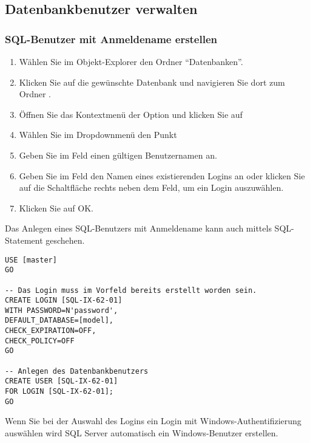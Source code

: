         \subsection{Datenbankbenutzer verwalten}
          \subsubsection{SQL-Benutzer mit Anmeldename erstellen}
            \begin{enumerate}
              \item Wählen Sie im Objekt-Explorer den Ordner
              \enquote{Datenbanken}.
              \item Klicken Sie auf die gewünschte Datenbank und navigieren
              Sie dort zum Ordner .
              \item Öffnen Sie das Kontextmenü der Option 
              und klicken Sie auf 
              \item Wählen Sie im Dropdownmenü  den Punkt
              \item Geben Sie im Feld  einen gültigen
              Benutzernamen an.
              \item Geben Sie im Feld  den Namen eines
              existierenden Logins an oder klicken Sie auf die Schaltfläche
              rechts neben dem Feld, um ein Login auszuwählen.
              \item Klicken Sie auf OK.
            \end{enumerate}
            Das Anlegen eines SQL-Benutzers mit Anmeldename kann auch mittels
            SQL-Statement geschehen.
            \begin{lstlisting}[language=ms_sql, caption={Anlegen eines
            SQL-Benutzers mit Anmeldename}, label=admin19_08b]
USE [master]
GO

-- Das Login muss im Vorfeld bereits erstellt worden sein.
CREATE LOGIN [SQL-IX-62-01]
WITH PASSWORD=N'password', 
DEFAULT_DATABASE=[model], 
CHECK_EXPIRATION=OFF, 
CHECK_POLICY=OFF
GO

-- Anlegen des Datenbankbenutzers
CREATE USER [SQL-IX-62-01]
FOR LOGIN [SQL-IX-62-01];
GO
            \end{lstlisting}
            \begin{merke}
              Wenn Sie bei der Auswahl des Logins ein Login mit
              Windows-Authentifizierung auswählen wird SQL Server automatisch
              ein Windows-Benutzer erstellen.
            \end{merke}            
